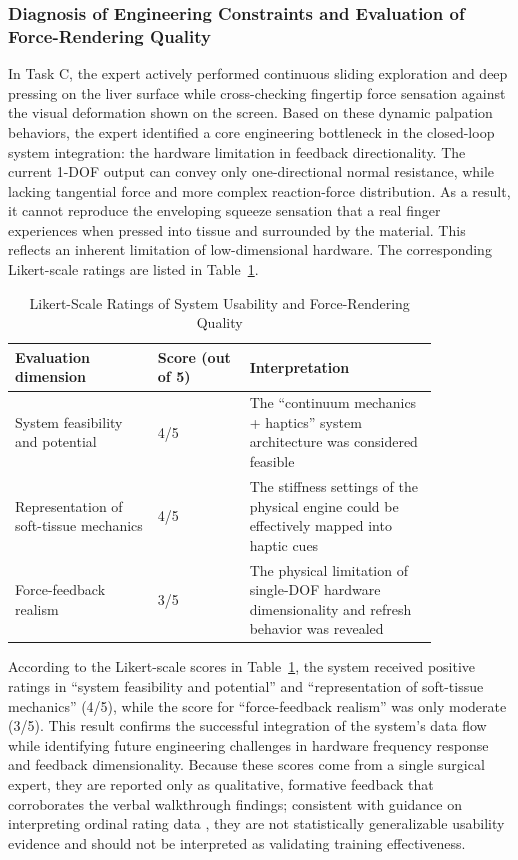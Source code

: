 \documentclass{ieeeaccess}
\begin{document}
\subsubsection{Diagnosis of Engineering Constraints and Evaluation of Force-Rendering Quality}
In Task C, the expert actively performed continuous sliding exploration and deep pressing on the liver surface while cross-checking fingertip force sensation against the visual deformation shown on the screen. Based on these dynamic palpation behaviors, the expert identified a core engineering bottleneck in the closed-loop system integration: the hardware limitation in feedback directionality. The current 1-DOF output can convey only one-directional normal resistance, while lacking tangential force and more complex reaction-force distribution. As a result, it cannot reproduce the enveloping squeeze sensation that a real finger experiences when pressed into tissue and surrounded by the material. This reflects an inherent limitation of low-dimensional hardware. The corresponding Likert-scale ratings are listed in Table~\ref{tab:likert}.

\begin{table}[htbp]
\caption{Likert-Scale Ratings of System Usability and Force-Rendering Quality}
\label{tab:likert}
\centering
\footnotesize
\renewcommand{\arraystretch}{1.15}
\begin{tabular}{|p{0.29\linewidth}|p{0.18\linewidth}|p{0.37\linewidth}|}
\hline
Evaluation dimension & Score (out of 5) & Interpretation \\
\hline
System feasibility and potential & 4/5 & The ``continuum mechanics + haptics'' system architecture was considered feasible \\
\hline
Representation of soft-tissue mechanics & 4/5 & The stiffness settings of the physical engine could be effectively mapped into haptic cues \\
\hline
Force-feedback realism & 3/5 & The physical limitation of single-DOF hardware dimensionality and refresh behavior was revealed \\
\hline
\end{tabular}
\end{table}

According to the Likert-scale scores in Table~\ref{tab:likert}, the system received positive ratings in ``system feasibility and potential'' and ``representation of soft-tissue mechanics'' (4/5), while the score for ``force-feedback realism'' was only moderate (3/5). This result confirms the successful integration of the system's data flow while identifying future engineering challenges in hardware frequency response and feedback dimensionality. Because these scores come from a single surgical expert, they are reported only as qualitative, formative feedback that corroborates the verbal walkthrough findings; consistent with guidance on interpreting ordinal rating data \cite{sullivan2013analyzing}, they are not statistically generalizable usability evidence and should not be interpreted as validating training effectiveness.
\end{document}
